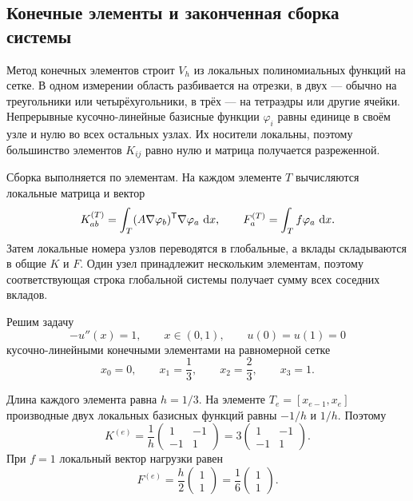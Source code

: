 \subsection{Конечные элементы и законченная сборка системы}

Метод конечных элементов строит $V_h$ из локальных полиномиальных функций на сетке. В одном измерении область разбивается на отрезки, в двух --- обычно на треугольники или четырёхугольники, в трёх --- на тетраэдры или другие ячейки. Непрерывные кусочно-линейные базисные функции $\varphi_i$ равны единице в своём узле и нулю во всех остальных узлах. Их носители локальны, поэтому большинство элементов $K_{ij}$ равно нулю и матрица получается разреженной.

Сборка выполняется по элементам. На каждом элементе $T$ вычисляются локальные матрица и вектор
\begin{equation}
\label{eq:local-fem-contributions-v05}
 K^{(T)}_{ab}
 =
 \int_T
 (A\nabla\varphi_b)^{\mathsf{T}}\nabla\varphi_a\,\mathop{}\!\mathrm{d} x,
 \qquad
 F^{(T)}_a
 =
 \int_T f\varphi_a\,\mathop{}\!\mathrm{d} x.
\end{equation}
Затем локальные номера узлов переводятся в глобальные, а вклады складываются в общие $K$ и $F$. Один узел принадлежит нескольким элементам, поэтому соответствующая строка глобальной системы получает сумму всех соседних вкладов.

\begin{problem}
Решим задачу
\begin{equation}
\label{eq:fem-worked-problem-v05}
 -u''(x)=1,
 \qquad
 x\in(0,1),
 \qquad
 u(0)=u(1)=0
\end{equation}
кусочно-линейными конечными элементами на равномерной сетке
\[
 x_0=0,
 \qquad
 x_1=\frac13,
 \qquad
 x_2=\frac23,
 \qquad
 x_3=1.
\]
\end{problem}

Длина каждого элемента равна $h=1/3$. На элементе $T_e=[x_{e-1},x_e]$ производные двух локальных базисных функций равны $-1/h$ и $1/h$. Поэтому
\begin{equation}
\label{eq:local-stiffness-worked-v05}
 K^{(e)}
 =
 \frac1h
 \begin{pmatrix}
 1&-1\\
 -1&1
 \end{pmatrix}
 =
 3
 \begin{pmatrix}
 1&-1\\
 -1&1
 \end{pmatrix}.
\end{equation}
При $f=1$ локальный вектор нагрузки равен
\begin{equation}
\label{eq:local-load-worked-v05}
 F^{(e)}
 =
 \frac h2
 \begin{pmatrix}
 1\\
 1
 \end{pmatrix}
 =
 \frac16
 \begin{pmatrix}
 1\\
 1
 \end{pmatrix}.
\end{equation}

